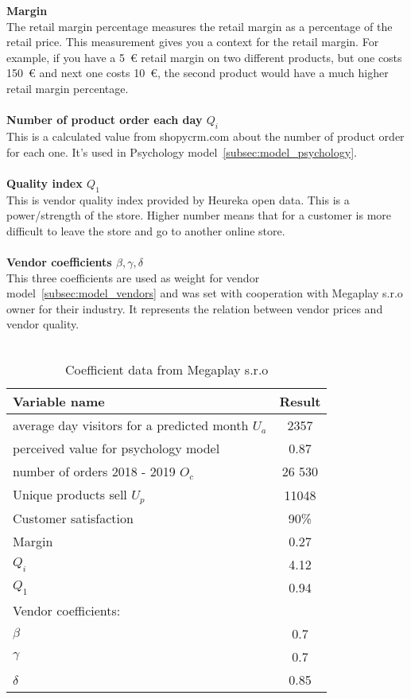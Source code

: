 \textbf{Margin}\\
The retail margin percentage measures the retail margin as a percentage of the retail price.
This measurement gives you a context for the retail margin.
For example, if you have a 5~€ retail margin on two different products, but one costs 150~€ and next one costs 10~€, the second product would have a much higher retail margin percentage.\\
\\
\textbf{Number of product order each day $Q_i$}\\
This is a calculated value from shopycrm.com about the number of product order for each one.
It's used in Psychology model~\ref{subsec:model_psychology}. \\
\\
\textbf{Quality index $Q_1$}\\
This is vendor quality index provided by Heureka open data.
This is a power/strength of the store.
Higher number means that for a customer is more difficult to leave the store and go to another online store.\\
\\
\textbf{Vendor coefficients $\beta, \gamma, \delta$} \label{vendorCoeff}\\
This three coefficients are used as weight for vendor model~\ref{subsec:model_vendors} and was set with cooperation with Megaplay s.r.o owner for their industry.
It represents the relation between vendor prices and vendor quality.\\
\\
\begin{table}[h!]
    \begin{center}
        \begin{tabular}{ | l | c |}
            \hline
            {\textbf{Variable name}} & \textbf{Result}\\
            \hline
            average day visitors for a predicted month $U_a$& 2357 \\
            perceived value for psychology model & 0.87 \\
            number of orders 2018 - 2019 $O_c$ & 26 530 \\
            Unique products sell $U_p$ & 11048\\
            Customer satisfaction & 90\%\\
            Margin & 0.27\\
            $Q_i$ & 4.12\\
            $Q_1$ & 0.94\\
            Vendor coefficients: & \\
            $\beta$ & 0.7\\
            $\gamma$ & 0.7\\
            $\delta$ & 0.85\\
            \hline
        \end{tabular}
    \end{center}
    \caption{Coefficient data from Megaplay s.r.o}
    \label{megaplay_data}
\end{table}
